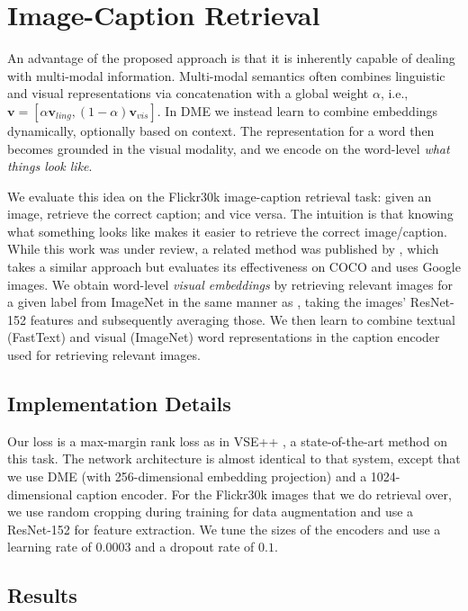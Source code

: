 \documentclass[11pt,a4paper]{article}
\begin{document}
\section{Image-Caption Retrieval}
\label{sec:imgcap}

An advantage of the proposed approach is that it is inherently capable of dealing with multi-modal information. Multi-modal semantics \cite{Bruni:2014jair} often combines linguistic and visual representations via concatenation with a global weight $\alpha$, i.e., $\mathbf{v} = [\alpha \mathbf{v}_{ling}, (1-\alpha) \mathbf{v}_{vis}]$. In DME we instead learn to combine embeddings dynamically, optionally based on context. The representation for a word then becomes grounded in the visual modality, and we encode on the word-level \emph{what things look like}.

We evaluate this idea on the Flickr30k image-caption retrieval task: given an image, retrieve the correct caption; and vice versa. The intuition is that knowing what something looks like makes it easier to retrieve the correct image/caption. While this work was under review, a related method was published by , which takes a similar approach but evaluates its effectiveness on COCO and uses Google images. We obtain word-level \emph{visual embeddings} by retrieving relevant images for a given label from ImageNet in the same manner as , taking the images' ResNet-152 features \cite{He:2016cvpr} and subsequently averaging those. We then learn to combine textual (FastText) and visual (ImageNet) word representations in the caption encoder used for retrieving relevant images.

\subsection{Implementation Details}

Our loss is a max-margin rank loss as in VSE++ \cite{Faghri:2017arxiv}, a state-of-the-art method on this task. The network architecture is almost identical to that system, except that we use DME (with 256-dimensional embedding projection) and a 1024-dimensional caption encoder. For the Flickr30k images that we do retrieval over, we use random cropping during training for data augmentation and use a ResNet-152 for feature extraction. We tune the sizes of the encoders and use a learning rate of $0.0003$ and a dropout rate of $0.1$.

\subsection{Results}
\end{document}
